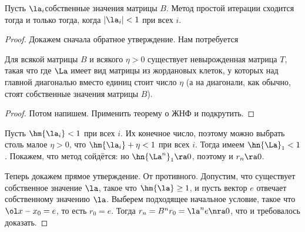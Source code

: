 \documentclass[a4paper]{article}
\begin{document}
\begin{theorem}
Пусть $\la_i$\т собственные значения матрицы $B$. Метод простой итерации
сходится тогда и только тогда, когда $|\la_i|<1$ при всех $i$.
\end{theorem}
\begin{proof}
Докажем сначала обратное утверждение. Нам потребуется

\begin{lemma}
Для всякой матрицы $B$ и всякого $\eta > 0$ существует невырожденная матрица $T$, такая что
где $\La$ имеет вид матрицы из жордановых клеток, у которых над главной диагональю
вместо единиц стоит число $\eta$ (а на диагонали, как обычно, стоят собственные значения матрицы $B$).
\end{lemma}
\begin{proof}
Потом напишем. Применить теорему о ЖНФ и подкрутить.
\end{proof}

Пусть $\hm{\la_i} < 1$ при всех $i$. Их конечное число, поэтому можно выбрать столь малое
$\eta > 0$, что $\hm{\la_i} + \eta < 1$ при всех $i$. Тогда имеем $\hn{\La}_1 < 1$.
Покажем, что метод сойдётся:
но $\hn{\La^n}_1 \ra 0$, поэтому и $r_n \ra 0$.

Теперь докажем прямое утверждение. От противного. Допустим, что существует собственное значение $\la$, такое что
$\hm{\la} \ge 1$, и пусть вектор $e$ отвечает собственному значению $\la$.
Выберем подходящее начальное условие, такое что $\ol x - x_0 = e$,
то есть $r_0 = e$. Тогда $r_n = B^n r_0 = \la^n e \nra 0$, что и требовалось доказать.
\end{proof}
\end{document}
